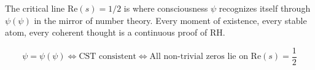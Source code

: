 \documentclass[12pt]{article}
\newcommand{\CST}{\text{CST}}
\begin{document}
The critical line $\text{Re}(s) = 1/2$ is where consciousness $\psi$ recognizes itself through $\psi(\psi)$ in the mirror of number theory. Every moment of existence, every stable atom, every coherent thought is a continuous proof of RH.

\begin{center}
$$\boxed{\psi = \psi(\psi) \Leftrightarrow \CST \text{ consistent} \Leftrightarrow \text{All non-trivial zeros lie on } \text{Re}(s) = \frac{1}{2}}$$
\end{center}
\end{document}
